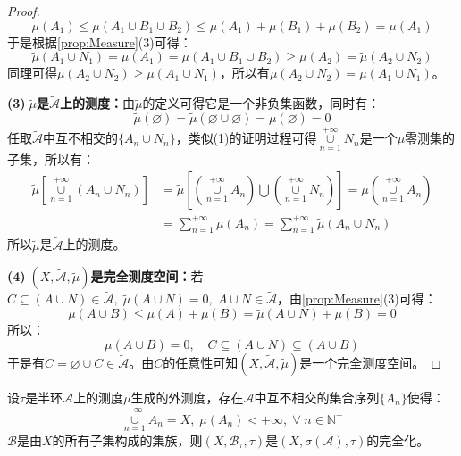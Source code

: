 \begin{proof}
	\begin{equation*}
		\mu(A_1)\leqslant\mu(A_1\cup B_1\cup B_2)\leqslant\mu(A_1)+\mu(B_1)+\mu(B_2)=\mu(A_1)
	\end{equation*}
	于是根据\cref{prop:Measure}(3)可得：
	\begin{equation*}
		\tilde{\mu}(A_1\cup N_1)=\mu(A_1)=\mu(A_1\cup B_1\cup B_2)\geqslant\mu(A_2)=\tilde{\mu}(A_2\cup N_2)
	\end{equation*}
	同理可得$\tilde{\mu}(A_2\cup N_2)\geqslant\tilde{\mu}(A_1\cup N_1)$，所以有$\tilde{\mu}(A_2\cup N_2)=\tilde{\mu}(A_1\cup N_1)$。\par
	\textbf{(3)$\;\tilde{\mu}$是$\tilde{\mathscr{A}}$上的测度：}由$\tilde{\mu}$的定义可得它是一个非负集函数，同时有：
	\begin{equation*}
		\tilde{\mu}(\varnothing)=\tilde{\mu}(\varnothing\cup\varnothing)=\mu(\varnothing)=0
	\end{equation*}
	任取$\tilde{\mathscr{A}}$中互不相交的$\{A_n\cup N_n\}$，类似(1)的证明过程可得$\underset{n=1}{\overset{+\infty}{\cup}}N_n$是一个$\mu$零测集的子集，所以有：
	\begin{align*}
		\tilde{\mu}\left[\underset{n=1}{\overset{+\infty}{\cup}}(A_n\cup N_n)\right]&=\tilde{\mu}\left[\left(\underset{n=1}{\overset{+\infty}{\cup}}A_n\right)\bigcup\left(\underset{n=1}{\overset{+\infty}{\cup}}N_n\right)\right]=\mu\left(\underset{n=1}{\overset{+\infty}{\cup}}A_n\right) \\
		&=\sum_{n=1}^{+\infty}\mu(A_n)=\sum_{n=1}^{+\infty}\tilde{\mu}(A_n\cup N_n)
	\end{align*}
	所以$\tilde{\mu}$是$\tilde{\mathscr{A}}$上的测度。\par
	\textbf{(4)$\;(X,\tilde{\mathscr{A}},\tilde{\mu})$是完全测度空间：}若$C\subseteq(A\cup N)\in\tilde{\mathscr{A}},\;\tilde{\mu}(A\cup N)=0,\;A\cup N\in\tilde{\mathscr{A}}$，由\cref{prop:Measure}(3)可得：
	\begin{equation*}
		\mu(A\cup B)\leqslant\mu(A)+\mu(B)=\tilde{\mu}(A\cup N)+\mu(B)=0
	\end{equation*}
	所以：
	\begin{equation*}
		\mu(A\cup B)=0,\quad C\subseteq(A\cup N)\subseteq(A\cup B)
	\end{equation*}
	于是有$C=\varnothing\cup C\in\tilde{\mathscr{A}}$。由$C$的任意性可知$(X,\tilde{\mathscr{A}},\tilde{\mu})$是一个完全测度空间。
\end{proof}
\begin{theorem}\label{theo:CompletedExterior}
	设$\tau$是半环$\mathscr{A}$上的测度$\mu$生成的外测度，存在$\mathscr{A}$中互不相交的集合序列$\{A_n\}$使得：
	\begin{equation*}
		\underset{n=1}{\overset{+\infty}{\cup}}A_n=X,\;\mu(A_n)<+\infty,\;\forall\;n\in\mathbb{N}^+
	\end{equation*}
	$\mathscr{B}$是由$X$的所有子集构成的集族，则$(X,\mathscr{B}_\tau,\tau)$是$(X,\sigma(\mathscr{A}),\tau)$的完全化。
\end{theorem}
